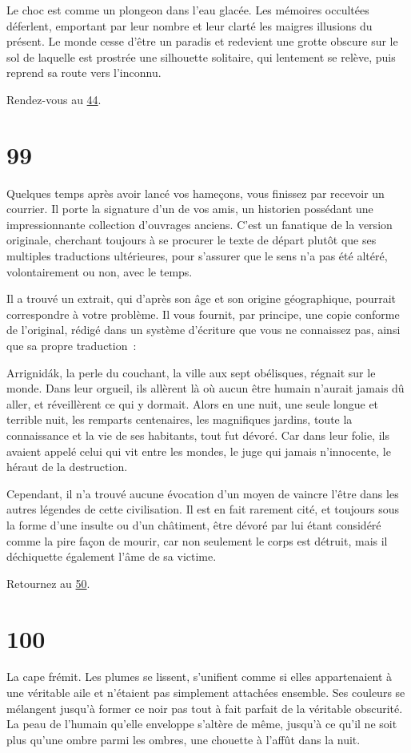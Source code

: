 \documentclass{report}
\newcommand{\gsection}[1]{
    \section{#1}
    \label{section-#1}
}
\newcommand{\glink}[1]{\hyperref[section-#1]{#1}}
\begin{document}
Le choc est comme un plongeon dans l'eau glacée. Les mémoires occultées déferlent, emportant par leur nombre et leur clarté les maigres illusions du présent. Le monde cesse d'être un paradis et redevient une grotte obscure sur le sol de laquelle est prostrée une silhouette solitaire, qui lentement se relève, puis reprend sa route vers l'inconnu.

Rendez-vous au \glink{44}.

\gsection{99}

Quelques temps après avoir lancé vos hameçons, vous finissez par recevoir un courrier. Il porte la signature d'un de vos amis, un historien possédant une impressionnante collection d'ouvrages anciens. C'est un fanatique de la version originale, cherchant toujours à se procurer le texte de départ plutôt que ses multiples traductions ultérieures, pour s'assurer que le sens n'a pas été altéré, volontairement ou non, avec le temps.

Il a trouvé un extrait, qui d'après son âge et son origine géographique, pourrait correspondre à votre problème. Il vous fournit, par principe, une copie conforme de l'original, rédigé dans un système d'écriture que vous ne connaissez pas, ainsi que sa propre traduction :

Arrignidák, la perle du couchant, la ville aux sept obélisques, régnait sur le monde. Dans leur orgueil, ils allèrent là où aucun être humain n'aurait jamais dû aller, et réveillèrent ce qui y dormait. Alors en une nuit,  une seule longue et terrible nuit, les remparts centenaires, les magnifiques jardins, toute la connaissance et la vie de ses habitants, tout fut dévoré. Car dans leur folie, ils avaient appelé celui qui vit entre les mondes, le juge qui jamais n'innocente, le héraut de la destruction.

Cependant, il n'a trouvé aucune évocation d'un moyen de vaincre l'être dans les autres légendes de cette civilisation. Il est en fait rarement cité, et toujours sous la forme d'une insulte ou d'un châtiment, être dévoré par lui étant considéré comme la pire façon de mourir, car non seulement le corps est détruit, mais il déchiquette également l'âme de sa victime.

Retournez au \glink{50}.

\gsection{100}

La cape frémit. Les plumes se lissent, s'unifient comme si elles appartenaient à une véritable aile et n'étaient pas simplement attachées ensemble. Ses couleurs se mélangent jusqu'à former ce noir pas tout à fait parfait de la véritable obscurité. La peau de l'humain qu'elle enveloppe s'altère de même, jusqu'à ce qu'il ne soit plus qu'une ombre parmi les ombres, une chouette à l'affût dans la nuit.
\end{document}
